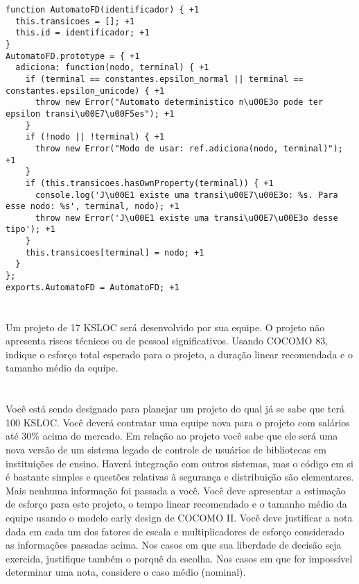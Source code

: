 \documentclass[10pt,a5paper]{report}
\begin{document}
\begin{lstlisting}
function AutomatoFD(identificador) { +1
  this.transicoes = []; +1
  this.id = identificador; +1
}
AutomatoFD.prototype = { +1
  adiciona: function(nodo, terminal) { +1
    if (terminal == constantes.epsilon_normal || terminal == constantes.epsilon_unicode) { +1
      throw new Error("Automato deterministico n\u00E3o pode ter epsilon transi\u00E7\u00F5es"); +1
    }
    if (!nodo || !terminal) { +1
      throw new Error("Modo de usar: ref.adiciona(nodo, terminal)"); +1
    }
    if (this.transicoes.hasOwnProperty(terminal)) { +1
      console.log('J\u00E1 existe uma transi\u00E7\u00E3o: %s. Para esse nodo: %s', terminal, nodo); +1
      throw new Error('J\u00E1 existe uma transi\u00E7\u00E3o desse tipo'); +1
    }
    this.transicoes[terminal] = nodo; +1
  }
};
exports.AutomatoFD = AutomatoFD; +1
\end{lstlisting}

\section{}

\qquad Um projeto de 17 KSLOC será desenvolvido por sua equipe. O projeto não
apresenta riscos técnicos ou de pessoal significativos. Usando COCOMO 83,
indique o esforço total esperado para o projeto, a duração linear recomendada e
o tamanho médio da equipe.

\section{}

\qquad Você está sendo designado para planejar um projeto do qual já se sabe que
terá 100 KSLOC. Você deverá contratar uma equipe nova para o projeto com
salários até 30\% acima do mercado. Em relação ao projeto você sabe que ele será
uma nova versão de um sistema legado de controle de usuários de bibliotecas em
instituições de ensino. Haverá integração com outros sistemas, mas o código em
si é bastante simples e questões relativas à segurança e distribuição são
elementares. Mais nenhuma informação foi passada a você. Você deve apresentar a
estimação de esforço para este projeto, o tempo linear recomendado e o tamanho
médio da equipe usando o modelo early design de COCOMO II. Você deve justificar
a nota dada em cada um dos fatores de escala e multiplicadores de esforço
considerado as informações passadas acima. Nos casos em que sua liberdade de
decisão seja exercida, justifique também o porquê da escolha. Nos casos em que
for impossível determinar uma nota, considere o caso médio (nominal).
\end{document}
